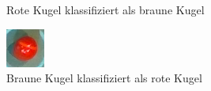 \begin{figure}[h!]
\begin{subfigure}[b]{0.2\textwidth}
                \caption{Rote Kugel klassifiziert als braune Kugel}
                \label{fig:classification_results_failed_classification_BROWN_RED_11_original}
        \end{subfigure}
        \hfill
        \begin{subfigure}[b]{0.2\textwidth}
                \raggedright
                \includegraphics[width=1.0\linewidth]{../common/04_results/resources/classification/failed_classification_RED_BROWN_1_original.png}
                \caption{Braune Kugel klassifiziert als rote Kugel}
                \label{fig:classification_results_failed_classification_RED_BROWN_1_original}
        \end{subfigure}
        \hfill
        \begin{subfigure}[b]{0.2\textwidth}
                \raggedright

\end{subfigure}
\end{figure}
